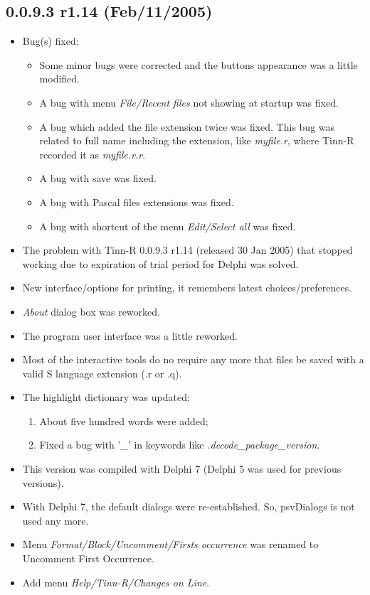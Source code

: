 \subsection*{0.0.9.3 r1.14 (Feb/11/2005)}
\begin{itemize}
  \item Bug(s) fixed:
    \begin{itemize}
      \item Some minor bugs were corrected and the buttons appearance was a little modified.
      \item A bug with menu \textit{File/Recent files} not showing at startup was fixed.
      \item A bug which added the file extension twice was fixed.
        This bug was related to full name including the extension, like \textit{myfile.r}, 
        where Tinn-R recorded it as \textit{myfile.r.r}.
      \item A bug with save was fixed.
      \item A bug with Pascal files extensions was fixed.
      \item A bug with shortcut of the menu \textit{Edit/Select all} was fixed.
    \end{itemize}
  \item The problem with Tinn-R 0.0.9.3 r1.14 (released 30 Jan 2005) that stopped working due to expiration of 
    trial period for Delphi was solved.
  \item New interface/options for printing, it remembers latest choices/preferences.
  \item \textit{About} dialog box was reworked.
  \item The program user interface was a little reworked.
  \item Most of the interactive \RR{} tools do no require any more that files be saved with a valid 
    S language extension (.r or .q).
  \item The \RR{} highlight dictionary was updated:
    \begin{enumerate}
      \item About five hundred words were added;
      \item Fixed a bug with '\_' in keywords like \textit{.decode\_package\_version}.
    \end{enumerate}
  \item This version was compiled with Delphi 7 (Delphi 5 was used for previous versions).
  \item With Delphi 7, the default dialogs were re-established. So, psvDialogs is not used any more.
  \item Menu \textit{Format/Block/Uncomment/Firsts occurrence} was renamed to Uncomment First Occurrence.
  \item Add menu \textit{Help/Tinn-R/Changes on Line}.
\end{itemize}

